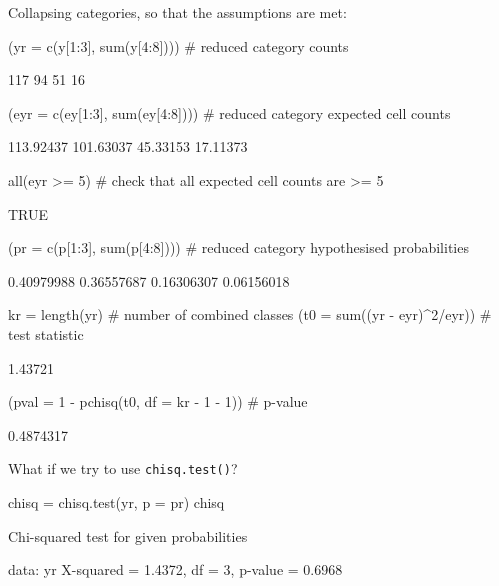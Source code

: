 \documentclass[a4paper]{article}
\begin{document}
Collapsing categories, so that the assumptions are met:
\begin{Schunk}
\begin{Sinput}
(yr = c(y[1:3], sum(y[4:8])))  # reduced category counts
\end{Sinput}
\begin{Soutput}
[1] 117  94  51  16
\end{Soutput}
\begin{Sinput}
(eyr = c(ey[1:3], sum(ey[4:8])))  # reduced category expected cell counts
\end{Sinput}
\begin{Soutput}
[1] 113.92437 101.63037  45.33153  17.11373
\end{Soutput}
\begin{Sinput}
all(eyr >= 5)  # check that all expected cell counts are >= 5
\end{Sinput}
\begin{Soutput}
[1] TRUE
\end{Soutput}
\begin{Sinput}
(pr = c(p[1:3], sum(p[4:8])))  # reduced category hypothesised probabilities
\end{Sinput}
\begin{Soutput}
[1] 0.40979988 0.36557687 0.16306307 0.06156018
\end{Soutput}
\begin{Sinput}
kr = length(yr)  # number of combined classes
(t0 = sum((yr - eyr)^2/eyr))  # test statistic
\end{Sinput}
\begin{Soutput}
[1] 1.43721
\end{Soutput}
\begin{Sinput}
(pval = 1 - pchisq(t0, df = kr - 1 - 1))  # p-value
\end{Sinput}
\begin{Soutput}
[1] 0.4874317
\end{Soutput}
\end{Schunk}
What if we try to use \lstinline|chisq.test()|?
\begin{Schunk}
\begin{Sinput}
chisq = chisq.test(yr, p = pr)
chisq
\end{Sinput}
\begin{Soutput}

	Chi-squared test for given probabilities

data:  yr
X-squared = 1.4372, df = 3, p-value = 0.6968
\end{Soutput}
\end{Schunk}
\end{document}
